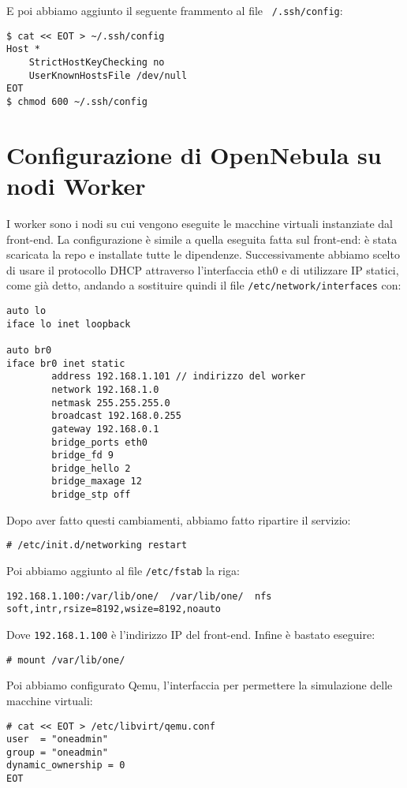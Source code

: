 \documentclass[twoside]{article}
\begin{document}
E poi abbiamo aggiunto il seguente frammento al file \texttt{~/.ssh/config}:
\begin{lstlisting}[frame=trBL]
$ cat << EOT > ~/.ssh/config
Host *
    StrictHostKeyChecking no
    UserKnownHostsFile /dev/null
EOT
$ chmod 600 ~/.ssh/config
\end{lstlisting}

\section{Configurazione di OpenNebula su nodi Worker}
I worker sono i nodi su cui vengono eseguite le macchine virtuali instanziate dal front-end.
La configurazione è simile a quella eseguita fatta sul front-end: è stata scaricata la repo
e installate tutte le dipendenze. Successivamente abbiamo scelto di usare il protocollo DHCP
attraverso l'interfaccia eth0 e di utilizzare IP statici, come già detto, andando a sostituire
quindi il file \texttt{/etc/network/interfaces} con:
\begin{lstlisting}[frame=trBL]
auto lo
iface lo inet loopback

auto br0
iface br0 inet static
        address 192.168.1.101 // indirizzo del worker
        network 192.168.1.0
        netmask 255.255.255.0
        broadcast 192.168.0.255
        gateway 192.168.0.1
        bridge_ports eth0
        bridge_fd 9
        bridge_hello 2
        bridge_maxage 12
        bridge_stp off
\end{lstlisting}

Dopo aver fatto questi cambiamenti, abbiamo fatto ripartire il servizio:
\begin{lstlisting}[frame=trBL]
# /etc/init.d/networking restart
\end{lstlisting}

Poi abbiamo aggiunto al file \texttt{/etc/fstab} la riga:
\begin{lstlisting}[frame=trBL]
192.168.1.100:/var/lib/one/  /var/lib/one/  nfs   soft,intr,rsize=8192,wsize=8192,noauto
\end{lstlisting}

Dove \texttt{192.168.1.100} è l'indirizzo IP del front-end. Infine è bastato eseguire:
\begin{lstlisting}[frame=trBL]
# mount /var/lib/one/
\end{lstlisting}

Poi abbiamo configurato Qemu, l'interfaccia per permettere la simulazione delle macchine virtuali:
\begin{lstlisting}[frame=trBL]
# cat << EOT > /etc/libvirt/qemu.conf
user  = "oneadmin"
group = "oneadmin"
dynamic_ownership = 0
EOT
\end{lstlisting}
\end{document}
